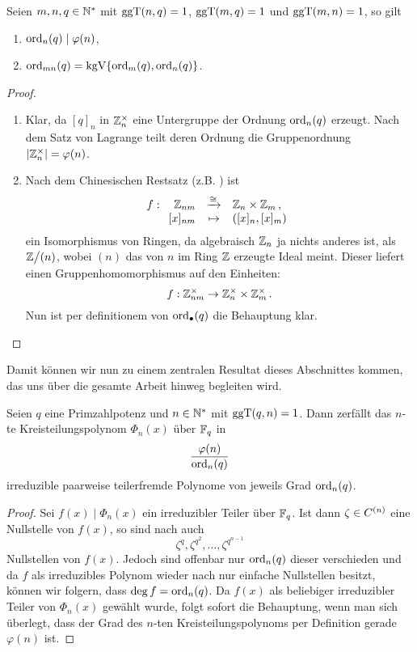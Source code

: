 \begin{lemma}
  \label{lemma:rechenregeln_ordn}
  Seien $m,n,q \in \mathbb{N}^\ast$ mit \newline $\operatorname{ggT}(n,q)=1$,
  $\operatorname{ggT}(m,q) = 1$ und $\operatorname{ggT}(m,n) = 1$, so gilt
  \begin{enumerate}
    \item $\operatorname{ord}_n(q) \mid \varphi(n)$,
    \item $\operatorname{ord}_{mn}(q) = \operatorname{kgV}\{ \operatorname{ord}_m(q), \operatorname{ord}_n(q)\}$.
  \end{enumerate}
\end{lemma}
\begin{proof}
  \begin{enumerate}
    \item Klar, da $[q]_n$ in $\mathbb{Z}_n^\times$ eine Untergruppe der Ordnung
      $\operatorname{ord}_n(q)$ erzeugt. 
      Nach dem Satz von Lagrange teilt deren Ordnung die 
      Gruppenordnung $|\mathbb{Z}_n^\times| = \varphi(n)$.
    \item Nach dem Chinesischen Restsatz 
      (z.B. \autocite[Kapitel 2 Satz 12]{bosch2009algebra}) ist
      \[ f: \funcdef{ \Z_{nm} &\xrightarrow{\cong}& \Z_n \times \Z_m\,,\\{} 
          [x]_{nm} &\mapsto& ([x]_n, [x]_m)}\]
      ein Isomorphismus von Ringen, 
      da algebraisch $\mathbb{Z}_n$ ja nichts anderes ist, als
      $\mathbb{Z}\big/(n)$, wobei $(n)$ das von $n$ im Ring $\mathbb{Z}$ erzeugte Ideal meint.
      Dieser liefert einen Gruppenhomomorphismus auf
      den Einheiten:
      \[ f: \mathbb{Z}_{nm}^\times \to \mathbb{Z}_n^\times \times \mathbb{Z}_m^\times\,.\]
      Nun ist per definitionem von $\operatorname{ord}_{\bullet}(q)$ die Behauptung
      klar.
  \end{enumerate}
\end{proof}

Damit können wir nun zu einem zentralen Resultat dieses Abschnittes kommen, das
uns über die gesamte Arbeit hinweg begleiten wird.

\begin{satz}
  \label{satz:zerfall_kreisteilungspolys}
  Seien $q$ eine Primzahlpotenz und $n\in \mathbb{N}^\ast$ mit $\operatorname{ggT}(q,n)=1$. Dann
  zerfällt das $n$-te Kreisteilungspolynom $\Phi_n(x)$ über $\mathbb{F}_q$ in
  \[ \frac{\varphi(n)}{\operatorname{ord}_n(q)}\]
  irreduzible paarweise teilerfremde Polynome von jeweils Grad $\operatorname{ord}_n(q)$.
\end{satz}
\begin{proof}
  Sei $f(x) \mid \Phi_n(x)$ ein irreduzibler Teiler über $\mathbb{F}_q$. Ist dann
  $\zeta \in C^{(n)}$ eine Nullstelle von $f(x)$, so sind 
  nach  auch
  \[ \zeta^q, \zeta^{q^2}, \ldots, \zeta^{q^{n-1}} \]
  Nullstellen von $f(x)$. Jedoch sind offenbar nur $\operatorname{ord}_n(q)$ dieser 
  verschieden und da $f$ als irreduzibles Polynom wieder nach 
   nur einfache Nullstellen besitzt,
  können wir folgern, dass $\deg f = \operatorname{ord}_n(q)$.
  Da $f(x)$ als beliebiger irreduzibler Teiler von $\Phi_n(x)$ gewählt wurde,
  folgt sofort die Behauptung, wenn man sich überlegt, dass der Grad des
  $n$-ten Kreisteilungspolynoms per Definition gerade $\varphi(n)$ ist.
\end{proof}


